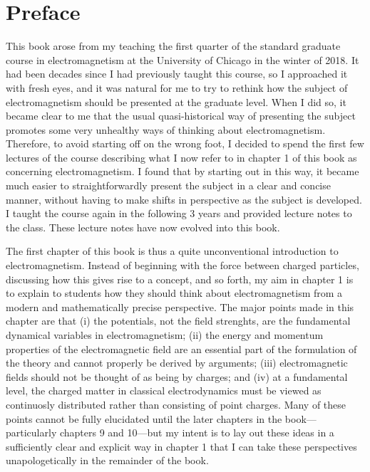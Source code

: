 \section*{Preface}

This book arose from my teaching the first quarter of the standard graduate course in electromagnetism at the University of Chicago in the winter of 2018. It had been decades since I had previously taught this course, so I approached it with fresh eyes, and it was natural for me to try to rethink how the subject of electromagnetism should be presented at the graduate level. When I did so, it became clear to me that the usual quasi-historical way of presenting the subject promotes some very unhealthy ways of thinking about electromagnetism. Therefore, to avoid starting off on the wrong foot, I decided to spend the first few lectures of the course describing what I now refer to in chapter 1 of this book as  concerning electromagnetism. I found that by starting out in this way, it became much easier to straightforwardly present the subject in a clear and concise manner, without having to make shifts in perspective as the subject is developed. I taught the course again in the following 3 years and provided lecture notes to the class. These lecture notes have now evolved into this book.

The first chapter of this book is thus a quite unconventional introduction to electromagnetism. Instead of beginning with the force between charged particles, discussing how this gives rise to a  concept, and so forth, my aim in chapter 1 is to explain to students how they should think about electromagnetism from a modern and mathematically precise perspective. The major points made in this chapter are that (i) the potentials, not the field strenghts, are the fundamental dynamical variables in electromagnetism; (ii) the energy and momentum properties of the electromagnetic field are an essential part of the formulation of the theory and cannot properly be derived by  arguments; (iii) electromagnetic fields should not be thought of as being  by charges; and (iv) at a fundamental level, the charged matter in classical electrodynamics must be viewed as continuosly distributed rather than consisting of point charges. Many of these points cannot be fully elucidated until the later chapters in the book---particularly chapters 9 and 10---but my intent is to lay out these ideas in a sufficiently clear and explicit way in chapter 1 that I can take these perspectives unapologetically in the remainder of the book.

